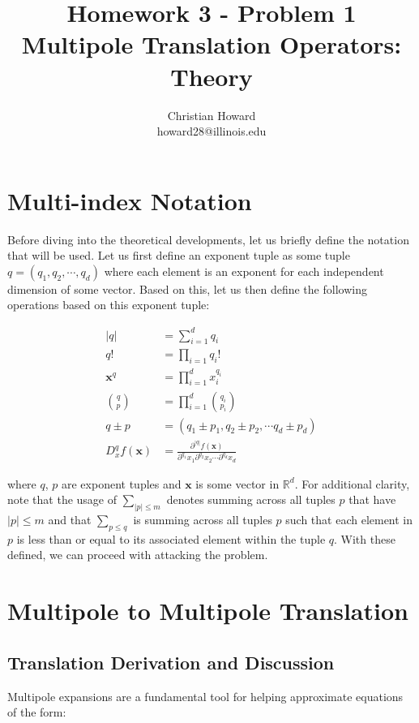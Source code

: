 \documentclass{article}[11pt]
\title{Homework 3 - Problem 1\\ Multipole Translation Operators: Theory}
\author{Christian Howard \\ howard28@illinois.edu }
\date{}
\newcommand{\bvec}[1]{\boldsymbol{#1}}
\begin{document}
   \maketitle
   
   \newpage
   
   \tableofcontents
   
   \newpage
  
   \section{Multi-index Notation}
   Before diving into the theoretical developments, let us briefly define the notation that will be used. Let us first define an exponent tuple as some tuple $q = \left(q_1, q_2, \cdots, q_d\right)$ where each element is an exponent for each independent dimension of some vector. Based on this, let us then define the following operations based on this exponent tuple:

   \begin{align*}
    |q| &= \sum_{i=1}^d q_i \\
    q! &= \prod_{i=1} q_i ! \\
    \bvec{x}^q &= \prod_{i=1}^d x_i^{q_i} \\
    \binom{q}{p} &= \prod_{i=1}^d \binom{q_i}{p_i} \\
    q \pm p &= \left(q_1 \pm p_1, q_2 \pm p_2, \cdots q_d \pm p_d\right) \\
    D_{x}^q f(\bvec{x}) &= \frac{\partial^{|q|} f(\bvec{x})}{\partial^{q_1}x_1 \partial^{q_2}x_2 \cdots \partial^{q_d}x_d}
   \end{align*}

   where $q$, $p$ are exponent tuples and $\bvec{x}$ is some vector in $\mathbb{R}^d$. For additional clarity, note that the usage of $\sum_{|p|\leq m}$ denotes summing across all tuples $p$ that have $|p| \leq m$ and that $\sum_{p\leq q}$ is summing across all tuples $p$ such that each element in $p$ is less than or equal to its associated element within the tuple $q$. With these defined, we can proceed with attacking the problem.

   \section{Multipole to Multipole Translation}
   \subsection{Translation Derivation and Discussion}
   Multipole expansions are a fundamental tool for helping approximate equations of the form:
\end{document}

